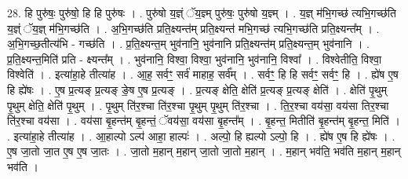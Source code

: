 \documentclass[17pt]{extarticle}
\begin{document}
28. हि पुरु॑षः॒ पुरु॑षो॒ हि हि पुरु॑षः । . पुरु॑षो य॒ज्ञ्ं ॅय॒ज्ञ्म् पुरु॑षः॒ पुरु॑षो य॒ज्ञ्म् । . य॒ज्ञ् म॑भि॒गच्छ॑ त्यभि॒गच्छ॑ति य॒ज्ञ्ं ॅय॒ज्ञ् म॑भि॒गच्छ॑ति । . अ॒भि॒गच्छ॑ति प्रति॒क्ष्यन्त॑म् प्रति॒क्ष्यन्त॑ मभि॒गच्छ॑ त्यभि॒गच्छ॑ति प्रति॒क्ष्यन्त᳚म् । . अ॒भि॒गच्छ॒तीत्य॑भि - गच्छ॑ति । . प्र॒ति॒क्ष्यन्त॒म् भुव॑नानि॒ भुव॑नानि प्रति॒क्ष्यन्त॑म् प्रति॒क्ष्यन्त॒म् भुव॑नानि । . प्र॒ति॒क्ष्यन्त॒मिति॑ प्रति - क्ष्यन्त᳚म् । . भुव॑नानि॒ विश्वा॒ विश्वा॒ भुव॑नानि॒ भुव॑नानि॒ विश्वा᳚ । . विश्वेतीति॒ विश्वा॒ विश्वेति॑ । . इत्या॑हा॒हे तीत्या॑ह । . आ॒ह॒ सर्वꣳ॒॒ सर्व॑ माहाह॒ सर्व᳚म् । . सर्वꣳ॒॒ हि हि सर्वꣳ॒॒ सर्वꣳ॒॒ हि । . ह्ये॑ष ए॒ष हि ह्ये॑षः । . ए॒ष प्र॒त्यङ् प्र॒त्यङ् ङे॒ष ए॒ष प्र॒त्यङ् । . प्र॒त्यङ् क्षेति॒ क्षेति॑ प्र॒त्यङ् प्र॒त्यङ् क्षेति॑ । . क्षेति॑ पृ॒थुम् पृ॒थुम् क्षेति॒ क्षेति॑ पृ॒थुम् । . पृ॒थुम् ति॑र॒श्चा ति॑र॒श्चा पृ॒थुम् पृ॒थुम् ति॑र॒श्चा । . ति॒र॒श्चा वय॑सा॒ वय॑सा तिर॒श्चा ति॑र॒श्चा वय॑सा । . वय॑सा बृ॒हन्त॑म् बृ॒हन्तं॒ ॅवय॑सा॒ वय॑सा बृ॒हन्त᳚म् । . बृ॒हन्त॒ मितीति॑ बृ॒हन्त॑म् बृ॒हन्त॒ मिति॑ । . इत्या॑हा॒हे तीत्या॑ह । . आ॒हाल्पो ऽल्प॑ आहा॒ हाल्पः॑ । . अल्पो॒ हि ह्यल्पो ऽल्पो॒ हि । . ह्ये॑ष ए॒ष हि ह्ये॑षः । . ए॒ष जा॒तो जा॒त ए॒ष ए॒ष जा॒तः । . जा॒तो म॒हान् म॒हान् जा॒तो जा॒तो म॒हान् । . म॒हान् भव॑ति॒ भव॑ति म॒हान् म॒हान् भव॑ति । \newline
\end{document}
